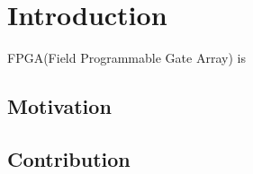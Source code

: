 \chapter{Introduction}
\label{cha:introduction}
FPGA(Field Programmable Gate Array) is 


\section{Motivation}
\label{sec:Motivation}







\section{Contribution}
\label{sec:contribution}


